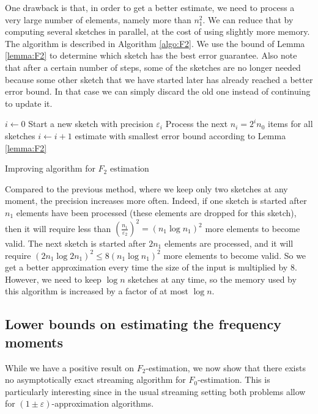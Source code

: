 \documentclass[a4paper,11pt,oneside,english,onecolumn]{article}
\theoremstyle{definition}
\newcommand{\eps}{\ensuremath{\varepsilon}}
\begin{document}
One drawback is that, in order to get a better estimate, we need to process a very large number of elements, namely more than $n_1^2$. We can reduce that by computing several sketches in parallel, at the cost of using slightly more memory. The algorithm is described in Algorithm \ref{algo:F2}. We use the bound of Lemma \ref{lemma:F2} to determine which sketch has the best error guarantee. Also note that after a certain number of steps, some of the sketches are no longer needed because some other sketch that we have started later has already reached a better error bound. In that case we can simply discard the old one instead of continuing to update it.

\begin{algorithm}
\DontPrintSemicolon {}
$i \gets 0$ \;
 {
Start a new sketch with precision $\eps_i$\;
  Process the next $n_i=2^i n_0$ items for all sketches \;
  $i \gets i+1$ \;
}
\Return estimate with smallest error bound according to Lemma \ref{lemma:F2}\;
\caption{Improving algorithm for $F_2$ estimation}
\label{algo:F2}
\end{algorithm}

Compared to the previous method, where we keep only two sketches at any moment, the precision increases more often. Indeed, if one sketch is started after $n_1$ elements have been processed (these elements are dropped for this sketch), then it will require less than $(\frac{n_1}{\eps_2})^2=(n_1 \allowbreak \log n_1)^2$ more elements to become valid. The next sketch is started after $2n_1$ elements are processed, and it will require $(2n_1 \log 2 n_1)^2 \leq 8(n_1 \log n_1)^2$ more elements to become valid. So we get a better approximation every time the size of the input is multiplied by 8. However, we need to keep $\log n$ sketches at any time, so the memory used by this algorithm is increased by a factor of at most $\log n$.

\subsection{Lower bounds on estimating the frequency moments}
While we have a positive result on $F_2$-estimation, we now show that there exists no asymptotically exact streaming algorithm for $F_0$-estimation. This is particularly interesting since in the usual streaming setting both problems allow for $(1\pm \eps)$-approximation algorithms.
\end{document}
